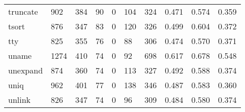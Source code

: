 \begin{longtable}{lp{1.3cm}p{1.3cm}p{1.3cm}p{1.3cm}p{1.3cm}p{1.3cm}p{1.3cm}p{1.3cm}p{1.3cm}}
truncate  &                    902 &                                384 &                                90 &                                0 &                               104 &                             324 &                                   0.471 &                                  0.574 &                                0.359 \\
tsort     &                    876 &                                347 &                                83 &                                0 &                               120 &                             326 &                                   0.499 &                                  0.604 &                                0.372 \\
tty       &                    825 &                                355 &                                76 &                                0 &                                88 &                             306 &                                   0.474 &                                  0.570 &                                0.371 \\
uname     &                   1274 &                                410 &                                74 &                                0 &                                92 &                             698 &                                   0.617 &                                  0.678 &                                0.548 \\
unexpand  &                    874 &                                360 &                                74 &                                0 &                               113 &                             327 &                                   0.492 &                                  0.588 &                                0.374 \\
uniq      &                    962 &                                401 &                                77 &                                0 &                               138 &                             346 &                                   0.487 &                                  0.583 &                                0.360 \\
unlink    &                    826 &                                347 &                                74 &                                0 &                                96 &                             309 &                                   0.484 &                                  0.580 &                                0.374 \\

\end{longtable}
